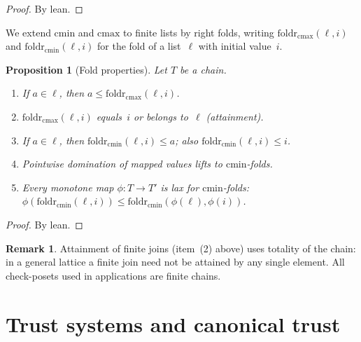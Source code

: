 \documentclass[11pt,a4paper]{article}
\theoremstyle{plain}
\newtheorem{proposition}[theorem]{Proposition}
\theoremstyle{definition}
\newtheorem{remark}[theorem]{Remark}
\newcommand{\cmin}{\mathrm{cmin}}
\newcommand{\cmax}{\mathrm{cmax}}
\begin{document}
\begin{proof}
By lean.
\end{proof}

We extend $\cmin$ and $\cmax$ to finite lists by right folds, writing
$\mathrm{foldr}_{\cmax}(\ell, i)$ and $\mathrm{foldr}_{\cmin}(\ell, i)$
for the fold of a list~$\ell$ with initial value~$i$.

\begin{proposition}[Fold properties]\label{prop:folds}
Let $T$ be a chain.
\begin{enumerate}
  \item If $a \in \ell$, then $a \le \mathrm{foldr}_{\cmax}(\ell, i)$.
  \item $\mathrm{foldr}_{\cmax}(\ell, i)$ equals~$i$ or belongs to~$\ell$
        (attainment).
  \item If $a \in \ell$, then $\mathrm{foldr}_{\cmin}(\ell, i) \le a$;
        also $\mathrm{foldr}_{\cmin}(\ell, i) \le i$.
  \item Pointwise domination of mapped values lifts to $\cmin$-folds.
  \item Every monotone map $\phi : T \to T'$ is lax for $\cmin$-folds:
        $\phi(\mathrm{foldr}_{\cmin}(\ell, i))
         \le \mathrm{foldr}_{\cmin}(\phi(\ell), \phi(i))$.
\end{enumerate}
\end{proposition}

\begin{proof}
By lean.
\end{proof}

\begin{remark}
Attainment of finite joins (item~(2) above) uses totality of the chain:
in a general lattice a finite join need not be attained by any single
element. All check-posets used in applications are finite chains.
\end{remark}

\section{Trust systems and canonical trust}
\end{document}
